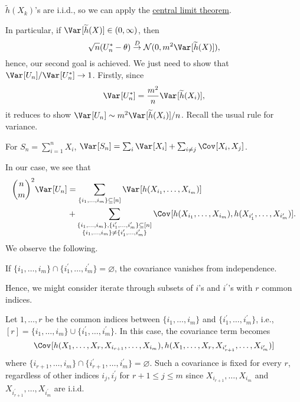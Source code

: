 \begin{note}
	\(\widetilde{h} (X_k)\)'s are i.i.d., so we can apply the \hyperref[thm:CLT]{central limit theorem}.
\end{note}

In particular, if \(\Var_{}[\widetilde{h} (X)] \in (0, \infty )\), then
\[
	\sqrt{n} (U_n^{\ast} - \theta ) \overset{D}{\to} \mathcal{N} (0, m^2 \Var_{}[\widetilde{h} (X)] ),
\]
hence, our second goal is achieved. We just need to show that \(\Var_{}[U_n] / \Var_{}[U_n^{\ast} ] \to 1\). Firstly, since
\[
	\Var_{}[U_n^{\ast} ]
	= \frac{m^2}{n} \Var_{}[\widetilde{h} (X_i)],
\]
it reduces to show \(\Var_{}[U_n] \sim m^2 \Var_{}[\widetilde{h} (X_i)] / n\). Recall the usual rule for variance.

\begin{prev}
	For \(S_n = \sum_{i=1}^{n} X_i\), \(\Var_{}[S_n] = \sum_{i} \Var_{}[X_i] + \sum_{i \neq j} \Cov_{}[X_i, X_j]\).
\end{prev}
In our case, we see that
\[
	\begin{split}
		\binom{n}{m}^2 \Var_{}[U_n]
		 & = \sum_{\{ i_1, \dots , i_m \} \subseteq [n]} \Var_{}[h(X_{i_1}, \dots , X_{i_m})]                 \\
		 & + \sum_{\substack{\{ i_1, \dots , i_m \} , \{ i_1^{\prime} , \dots , i_m^{\prime} \} \subseteq [n] \\ \{ i_1 , \dots , i_m \} \neq \{ i_1^{\prime} , \dots , i_m^{\prime} \}}} \Cov_{}[h(X_{i_1}, \dots , X_{i_m}), h(X_{i_1^{\prime} }, \dots , X_{i_m^{\prime} })].
	\end{split}
\]
We observe the following.

\begin{intuition}
	If \(\{ i_1, \dots , i_m \} \cap \{ i_1^{\prime} , \dots , i_m^{\prime}  \} = \varnothing \), the covariance vanishes from independence.
\end{intuition}

Hence, we might consider iterate through subsets of \(i\)'s and \(i^{\prime} \)'s with \(r\) common indices.

\begin{eg}
	Let \(1, \dots , r\) be the common indices between \(\{i_1, \dots , i_m \} \) and \(\{ i_1^{\prime} , \dots , i_m^{\prime} \} \), i.e., \([r] = \{i_1, \dots , i_m \} \cup \{ i_1^{\prime} , \dots , i_m^{\prime} \}\). In this case, the covariance term becomes
	\[
		\Cov_{}[h(X_1, \dots , X_r, X_{i_{r+1}}, \dots , X_{i_m}), h(X_1, \dots , X_r, X_{i_{r+1}^{\prime} }, \dots , X_{i_m^{\prime} })]
	\]
	where \(\{ i_{r+1} , \dots , i_m \} \cap \{ i_{r+1}^{\prime} , \dots , i_m^{\prime} \} = \varnothing \). Such a covariance is fixed for every \(r\), regardless of other indices \(i_j , i_j^{\prime} \) for \(r+1 \leq j \leq m\) since \(X_{i_{r+1}}, \dots , X_{i_m}\) and \(X_{i_{r+1}^{\prime} }, \dots , X_{i_m^{\prime} }\) are i.i.d.
\end{eg}

